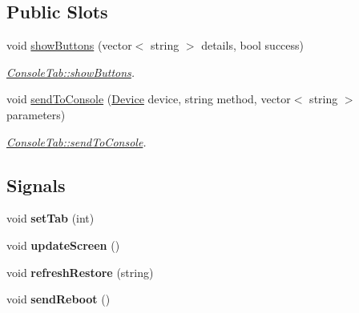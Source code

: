 \subsection*{Public Slots}
\begin{DoxyCompactItemize}
\item 
void \hyperlink{classConsoleTab_abda9ef659782544e72f0e4561c5583f0}{show\+Buttons} (vector$<$ string $>$ details, bool success)
\begin{DoxyCompactList}\small\item\em \hyperlink{classConsoleTab_abda9ef659782544e72f0e4561c5583f0}{Console\+Tab\+::show\+Buttons}. \end{DoxyCompactList}\item 
void \hyperlink{classConsoleTab_a695bb64854ca658dc9cc0a44c7a08f2c}{send\+To\+Console} (\hyperlink{classDevice}{Device} device, string method, vector$<$ string $>$ parameters)
\begin{DoxyCompactList}\small\item\em \hyperlink{classConsoleTab_a695bb64854ca658dc9cc0a44c7a08f2c}{Console\+Tab\+::send\+To\+Console}. \end{DoxyCompactList}\end{DoxyCompactItemize}
\subsection*{Signals}
\begin{DoxyCompactItemize}
\item 
\mbox{\label{classConsoleTab_afbcbf3f97fa59e43aa9fe86c9549ebed}} 
void {\bfseries set\+Tab} (int)
\item 
\mbox{\label{classConsoleTab_a741773c43f4a548ffd154022429a3830}} 
void {\bfseries update\+Screen} ()
\item 
\mbox{\label{classConsoleTab_a34925515a836a363cf85b25860c795d6}} 
void {\bfseries refresh\+Restore} (string)
\item 
\mbox{\label{classConsoleTab_af58a230f2f192469205839920dd7fa66}} 
void {\bfseries send\+Reboot} ()
\end{DoxyCompactItemize}
